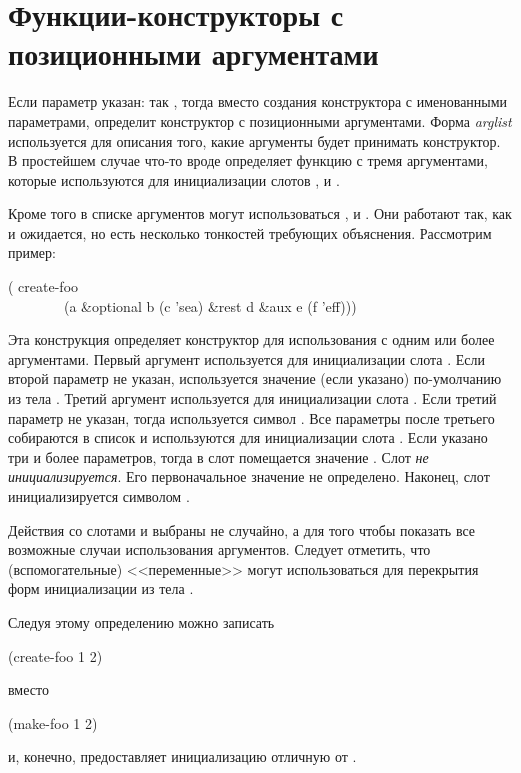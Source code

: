 \section{Функции-конструкторы с позиционными аргументами}
\label{DEFSTRUCT-CONSTRUCTOR-SYNTAX}

Если параметр  указан: так , тогда вместо создания конструктора с именованными
параметрами,  определит конструктор с позиционными аргументами.
Форма \emph{arglist} используется для описания того, какие аргументы будет
принимать конструктор. В простейшем случае что-то вроде  определяет функцию  с тремя аргументами,
которые используются для инициализации слотов ,  и .

Кроме того в списке аргументов могут использоваться , 
и . Они работают так, как и ожидается, но есть несколько тонкостей
требующих объяснения. Рассмотрим пример:
\begin{lisp}
( create-foo \\
~~~~~~~~(a \&optional b (c 'sea) \&rest d \&aux e (f 'eff)))
\end{lisp}
Эта конструкция определяет конструктор  для использования с
одним или более аргументами. Первый аргумент используется для инициализации
слота . Если второй параметр не указан, используется значение (если
указано) по-умолчанию из тела . Третий аргумент используется для
инициализации слота . Если третий параметр не указан, тогда используется
символ . Все параметры после третьего собираются в список и
используются для инициализации слота . Если указано три и более
параметров, тогда в слот  помещается значение {\false}. Слот 
\emph{не инициализируется}. Его первоначальное значение не определено. Наконец,
слот  инициализируется символом .

Действия со слотами  и  выбраны не случайно, а для того чтобы
показать все возможные случаи использования аргументов.
Следует отметить, что  (вспомогательные) <<переменные>> могут
использоваться для перекрытия форм инициализации из тела .

Следуя этому определению можно записать
\begin{lisp}
(create-foo 1 2)
\end{lisp}
вместо
\begin{lisp}
(make-foo  1  2)
\end{lisp}
и, конечно,  предоставляет инициализацию отличную от
.

